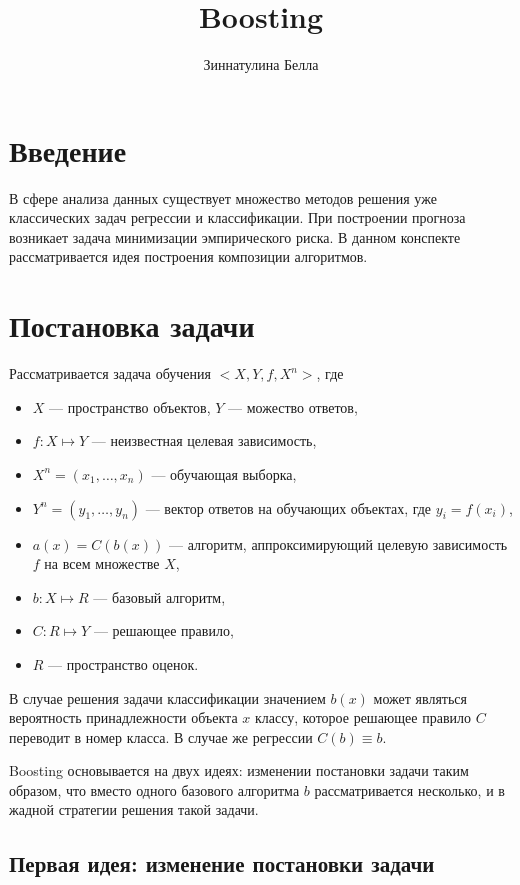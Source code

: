 \documentclass[specialist, 12pt, href]{article}
\title{Boosting}
\author{Зиннатулина Белла}
\date{}
\begin{document}
\maketitle



\section{Введение}

В сфере анализа данных существует множество методов решения уже классических задач регрессии и классификации.  
При построении прогноза возникает задача минимизации эмпирического риска. В данном конспекте рассматривается идея построения композиции алгоритмов. 

\section{Постановка задачи}

Рассматривается задача обучения $<X,Y, f, X^{n}>$, где  \begin{itemize}
 \item $X$ --- пространство объектов, $Y$ --- можество ответов,
 \item $f: X \mapsto Y$ --- неизвестная целевая зависимость,
 \item $X^{n} = (x_1,\dots,x_{n})$ --- обучающая выборка,
 \item $Y^{n} = (y_1,\dots, y_{n})$ --- вектор ответов на обучающих объектах, где $y_i = f(x_i)$,
 \item $a(x) = C(b(x))$ --- алгоритм, аппроксимирующий целевую зависимость $f$ на всем множестве $X$,
 \item $b:X \mapsto R$ --- базовый алгоритм,
 \item $C:R \mapsto Y$ --- решающее правило,
 \item $R$ --- пространство оценок.
 \end{itemize}

В случае решения задачи классификации значением $b(x)$ может являться вероятность принадлежности объекта $x$ классу, которое решающее правило $C$ переводит в номер класса. В случае же регрессии $C(b) \equiv b$.

Boosting основывается на двух идеях: изменении постановки задачи таким образом, что вместо одного базового алгоритма $b$ рассматривается несколько, и в жадной стратегии решения такой задачи.

\subsection*{Первая идея: изменение постановки задачи}
 
\end{document}
